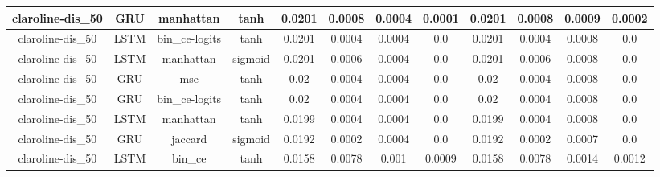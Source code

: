 \documentclass{article}%
\begin{document}
\begin{tabular}{|c|c|c|c|c|c|c|c|c|c|c|c|}
\hline%
claroline{-}dis\_50&GRU&manhattan&tanh&0.0201&0.0008&0.0004&0.0001&0.0201&0.0008&0.0009&0.0002\\%
\hline%
claroline{-}dis\_50&LSTM&bin\_ce{-}logits&tanh&0.0201&0.0004&0.0004&0.0&0.0201&0.0004&0.0008&0.0\\%
\hline%
claroline{-}dis\_50&LSTM&manhattan&sigmoid&0.0201&0.0006&0.0004&0.0&0.0201&0.0006&0.0008&0.0\\%
\hline%
claroline{-}dis\_50&GRU&mse&tanh&0.02&0.0004&0.0004&0.0&0.02&0.0004&0.0008&0.0\\%
\hline%
claroline{-}dis\_50&GRU&bin\_ce{-}logits&tanh&0.02&0.0004&0.0004&0.0&0.02&0.0004&0.0008&0.0\\%
\hline%
claroline{-}dis\_50&LSTM&manhattan&tanh&0.0199&0.0004&0.0004&0.0&0.0199&0.0004&0.0008&0.0\\%
\hline%
claroline{-}dis\_50&GRU&jaccard&sigmoid&0.0192&0.0002&0.0004&0.0&0.0192&0.0002&0.0007&0.0\\%
\hline%
claroline{-}dis\_50&LSTM&bin\_ce&tanh&0.0158&0.0078&0.001&0.0009&0.0158&0.0078&0.0014&0.0012\\%
\hline%
\end{tabular}

%
\newpage%
\end{document}
